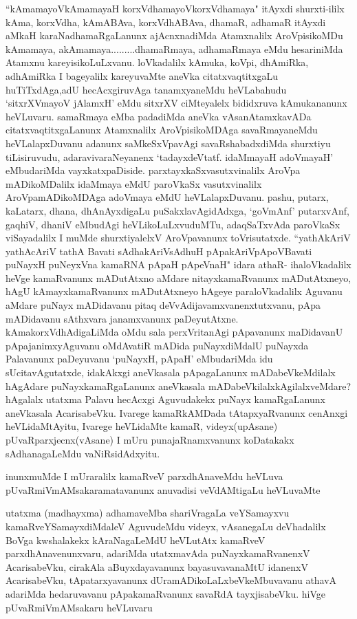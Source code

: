 \begin{artha}
``kAmamayoV\s kAmamayaH korxVdhamayoV\s korxVdhamaya" itAyxdi shurxti-ililx kAma, korxVdha, kAmABAva, korxVdhABAva, dhamaR, adhamaR itAyxdi aMkaH karaNadhamaRgaLanunx ajAcnxnadiMda Atamxnalilx AroVpisikoMDu kAmamaya, akAmamaya.........dhamaRmaya, adhamaRmaya eMdu hesariniMda Atamxnu kareyisikoLuLxvanu. loVkadalilx kAmuka, koVpi, dhAmiRka, adhAmiRka I bageyalilx kareyuvaMte aneVka citatxvaqtitxgaLu huTiTxdAga,adU hecAcxgiruvAga tanamxyaneMdu heVLabahudu `sitxrXVmayoV jAlamxH' eMdu sitxrXV ciMteyalelx bididxruva kAmukananunx heVLuvaru. samaRmaya eMba padadiMda aneVka vAsanAtamxkavADa citatxvaqtitxgaLanunx Atamxnalilx AroVpisikoMDAga savaRmayaneMdu heVLalapxDuvanu adanunx saMkeSxVpavAgi savaRshabadxdiMda shurxtiyu tiLisiruvudu, adaravivaraNeyanenx `tadayxdeVtatf. idaMmayaH adoVmayaH' eMbudariMda vayxkatxpaDiside. parxtayxkaSxvasutxvinalilx AroVpa mADikoMDalilx idaMmaya eMdU paroVkaSx vasutxvinalilx AroVpamADikoMDAga adoVmaya eMdU heVLalapxDuvanu. pashu, putarx, kaLatarx, dhana, dhAnAyxdigaLu puSakxlavAgidAdxga, `goVmAnf' putarxvAnf, gaqhiV, dhaniV eMbudAgi heVLikoLuLxvuduMTu, adaqSaTxvAda paroVkaSx viSayadalilx I muMde shurxtiyalelxV AroVpavanunx toVrisutatxde. ``yathAkAriV yathAcAriV tathA Bavati sAdhakAriVsAdhuH pApakAriVpApoVBavati puNayxH puNeyxVna kamaRNA pApaH pApeVnaH" idara athaR- ihaloVkadalilx heVge kamaRvanunx mADutAtxno aMdare nitayxkamaRvanunx mADutAtxneyo, hAgU kAmayxkamaRvanunx mADutAtxneyo hAgeye paraloVkadalilx Aguvanu aMdare puNayx mADidavanu pitaq deVvAdijavamxvanenxtutxvanu, pApa mADidavanu sAthxvara janamxvanunx paDeyutAtxne. kAmakorxVdhAdigaLiMda oMdu sala perxVritanAgi pApavanunx maDidavanU pApajanimxyAguvanu oMdAvatiR mADida puNayxdiMdalU puNayxda Palavanunx paDeyuvanu `puNayxH, pApaH' eMbudariMda idu sUcitavAgutatxde, idakAkxgi aneVkasala pApagaLanunx mADabeVkeMdilalx hAgAdare puNayxkamaRgaLanunx aneVkasala mADabeVkilalxkAgilalxveMdare? hAgalalx utatxma Palavu hecAcxgi Aguvudakekx puNayx kamaRgaLanunx aneVkasala AcarisabeVku. Ivarege kamaRkAMDada tAtapxyaRvanunx cenAnxgi heVLidaMtAyitu, Ivarege heVLidaMte kamaR, videyx(upAsane) pUvaRparxjecnx(vAsane) I mUru punajaRnamxvanunx koDatakakx sAdhanagaLeMdu vaNiRsidAdxyitu. 
\end{artha}

\begin{artha}
inunxmuMde I mUraralilx kamaRveV parxdhAnaveMdu heVLuva pUvaRmiVmAMsakaramatavanunx anuvadisi veVdAMtigaLu heVLuvaMte
\end{artha}

\begin{artha}
utatxma (madhayxma) adhamaveMba shariVragaLa veYSamayxvu kamaRveYSamayxdiMdaleV AguvudeMdu videyx, vAsanegaLu deVhadalilx BoVga kwshalakekx kAraNagaLeMdU heVLutAtx kamaRveV parxdhAnavenunxvaru, adariMda utatxmavAda puNayxkamaRvanenxV AcarisabeVku, cirakAla aBuyxdayavanunx bayasuvavanaMtU idanenxV AcarisabeVku, tApatarxyavanunx dUramADikoLaLxbeVkeMbuvavanu athavA adariMda hedaruvavanu pApakamaRvanunx savaRdA tayxjisabeVku. hiVge pUvaRmiVmAMsakaru heVLuvaru
\end{artha}

